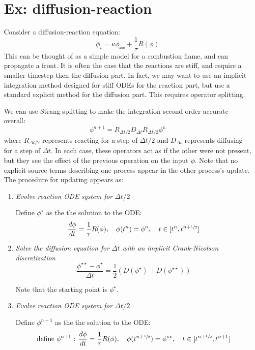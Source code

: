 \section{Ex: diffusion-reaction}
\label{sec:multiphys:diffreact}

Consider a diffusion-reaction equation:
\begin{equation}
\phi_t = \kappa \phi_{xx} + \frac{1}{\tau} R(\phi)
\end{equation}
This can be thought of as a simple model for a combustion flame, and
can propagate a front.  It is often the case that the reactions are
stiff, and require a smaller timestep then the diffusion part.  In
fact, we may want to use an implicit integration method designed for
stiff ODEs for the reaction part, but use a standard explicit method
for the diffusion part.  This requires operator splitting.

We can use Strang splitting \cite{strang} to make the integration
second-order accurate overall:
\begin{equation}
\phi^{n+1} = R_{\Delta t/2} D_{\Delta t} R_{\Delta t/2} \phi^n
\end{equation}
where $R_{\Delta t/2}$ represents reacting for a step of $\Delta t/2$
and $D_{\Delta t}$ represents diffusing for a step of $\Delta t$.  In
each case, these operators act as if the other were not present, but
they see the effect of the previous operation on the input $\phi$.  
Note that no explicit source terms describing one process appear in the other
process's update.  The procedure for updating appears as:
\begin{enumerate}
\item {\em Evolve reaction ODE system for $\Delta t/2$}

  Define $\phi^\star$ as the the solution to the ODE:
   \begin{equation}
     \frac{d\phi}{dt} = \frac{1}{\tau} R(\phi), \quad 
   \phi(t^n) = \phi^n, \quad t \in [t^n, t^{n+{\sfrac{1}{2}}}]
   \end{equation}

\item {\em Solve the diffusion equation for $\Delta t$ with an
           implicit Crank-Nicolson discretization}
   \begin{equation}
     \frac{\phi^{\star\star} - \phi^\star}{\Delta t} =
      \frac{1}{2} (D(\phi^\star) + D(\phi^{\star\star}))
   \end{equation}

   Note that the starting point is $\phi^\star$.

\item {\em Evolve reaction ODE system for $\Delta t/2$}

  Define $\phi^{n+1}$ as the the solution to the ODE:
   \begin{equation}
     \text{define } \phi^{n+1}: \, \frac{d\phi}{dt} = \frac{1}{\tau} R(\phi), \quad 
   \phi(t^{n+{\sfrac{1}{2}}}) = \phi^{\star\star}, \quad t \in [t^{n+{\sfrac{1}{2}}}, t^{n+1}]
   \end{equation}

\end{enumerate}

